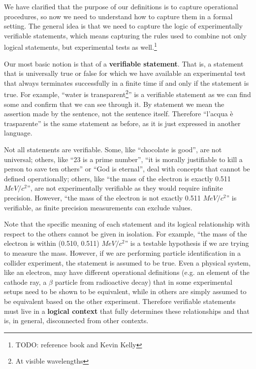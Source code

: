 \documentclass[10pt,twocolumn, nofootinbib]{revtex4-2}
\begin{document}
We have clarified that the purpose of our definitions is to capture operational procedures, so now we need to understand how to capture them in a formal setting. The general idea is that we need to capture the logic of experimentally verifiable statements, which means capturing the rules used to combine not only logical statements, but experimental tests as well.\footnote{TODO: reference book and Kevin Kelly}

Our most basic notion is that of a \textbf{verifiable statement}. That is, a statement that is universally true or false for which we have available an experimental test that always terminates successfully in a finite time if and only if the statement is true. For example, ``water is transparent\footnote{At visible wavelengths}'' is a verifiable statement as we can find some and confirm that we can see through it. By statement we mean the assertion made by the sentence, not the sentence itself. Therefore ``l'acqua \`e trasparente'' is the same statement as before, as it is just expressed in another language.

Not all statements are verifiable. Some, like ``chocolate is good'', are not universal; others, like ``23 is a prime number'', ``it is morally justifiable to kill a person to save ten others'' or ``God is eternal'', deal with concepts that cannot be defined operationally; others, like ``the mass of the electron is exactly 0.511 $MeV/c^2$'', are not experimentally verifiable as they would require infinite precision. However, ``the mass of the electron is not exactly 0.511 $MeV/c^2$'' is verifiable, as finite precision measurements can exclude values.

Note that the specific meaning of each statement and its logical relationship with respect to the others cannot be given in isolation. For example, ``the mass of the electron is within (0.510, 0.511) $MeV/c^2$'' is a testable hypothesis if we are trying to measure the mass. However, if we are performing particle identification in a collider experiment, the statement is assumed to be true. Even a physical system, like an electron, may have different operational definitions (e.g. an element of the cathode ray, a $\beta$ particle from radioactive decay) that in some experimental setups need to be shown to be equivalent, while in others are simply assumed to be equivalent based on the other experiment. Therefore verifiable statements must live in a \textbf{logical context} that fully determines these relationships and that is, in general, disconnected from other contexts.
\end{document}

